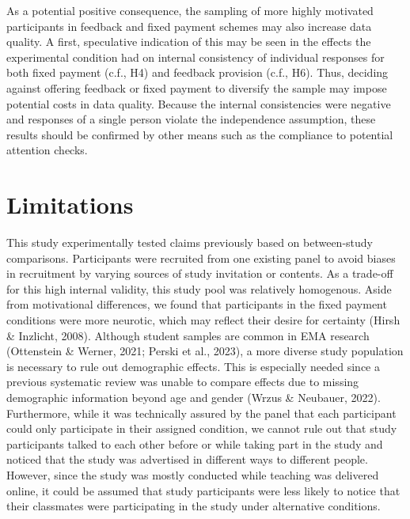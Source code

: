\documentclass[authordate, empirical]{jote-new-article}
\begin{document}
	As a potential positive consequence, the sampling of more highly motivated participants in feedback and fixed payment schemes may also increase data quality. A first, speculative indication of this may be seen in the effects the experimental condition had on internal consistency of individual responses for both fixed payment (c.f., H4) and feedback provision (c.f., H6). Thus, deciding against offering feedback or fixed payment to diversify the sample may impose potential costs in data quality. Because the internal consistencies were negative and responses of a single person violate the independence assumption, these results should be confirmed by other means such as the compliance to potential attention checks.



	\section{\textbf{Limitations}}



	This study experimentally tested claims previously based on between-study comparisons. Participants were recruited from one existing panel to avoid biases in recruitment by varying sources of study invitation or contents. As a trade-off for this high internal validity, this study pool was relatively homogenous. Aside from motivational differences, we found that participants in the fixed payment conditions were more neurotic, which may reflect their desire for certainty (Hirsh \& Inzlicht, 2008). Although student samples are common in EMA research (Ottenstein \& Werner, 2021; Perski et al., 2023), a more diverse study population is necessary to rule out demographic effects. This is especially needed since a previous systematic review was unable to compare effects due to missing demographic information beyond age and gender (Wrzus \& Neubauer, 2022). Furthermore, while it was technically assured by the panel that each participant could only participate in their assigned condition, we cannot rule out that study participants talked to each other before or while taking part in the study and noticed that the study was advertised in different ways to different people. However, since the study was mostly conducted while teaching was delivered online, it could be assumed that study participants were less likely to notice that their classmates were participating in the study under alternative conditions.
\end{document}

